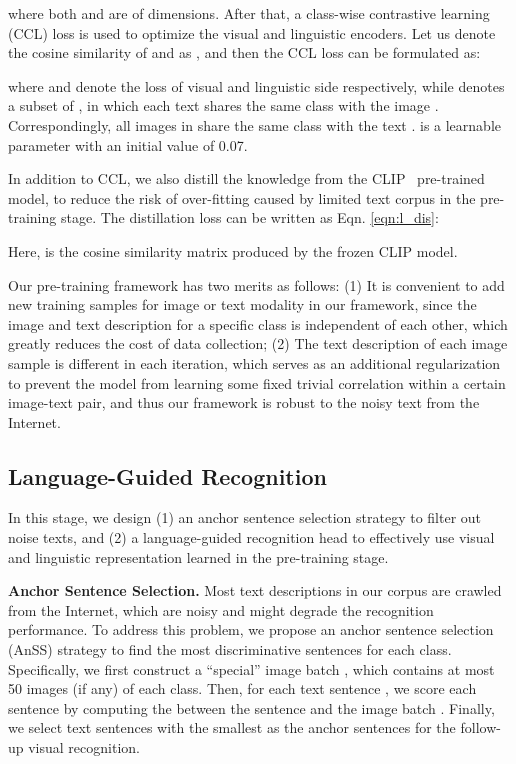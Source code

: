 \documentclass[runningheads]{llncs}
\begin{document}
where both  and  are of  dimensions. After that, a class-wise contrastive learning (CCL) loss is used to optimize the visual and linguistic encoders.
Let us denote the cosine similarity of  and  as , and then the CCL loss can be formulated as:

where  and  denote the loss of visual and linguistic side respectively, while  denotes a subset of , in which each text shares the same class with the image . Correspondingly, all images in  share the same class with the text .  is a learnable parameter with an initial value of 0.07.

In addition to CCL, we also distill the knowledge from the CLIP~\cite{clip} pre-trained model, to reduce the risk of over-fitting caused by limited text corpus in the pre-training stage.
The distillation loss  can be written as Eqn. \ref{eqn:l_dis}:

Here,  is the cosine similarity matrix produced by the frozen CLIP model.

Our pre-training framework has two merits as follows:
(1)
It is convenient to add new training samples for image or text modality in our framework,
since the image and text description for a specific class is independent of each other, which greatly reduces the cost of data collection;
(2) The text description of each image sample is different in each iteration, which serves as an additional regularization to prevent the model from learning some fixed trivial correlation within a certain image-text pair, and thus our framework is robust to the noisy text from the Internet.


\subsection{Language-Guided Recognition}

In this stage, we design (1) an anchor sentence selection strategy to filter out noise texts, and (2) a language-guided recognition head to effectively use visual and linguistic representation learned in the pre-training stage.

\noindent\textbf{Anchor Sentence Selection.} Most text descriptions in our corpus are crawled from the Internet, which are noisy and might degrade the recognition performance. 
To address this problem, we propose an anchor sentence selection (AnSS) strategy to find the most discriminative sentences for each class. 
Specifically, we first construct a ``special'' image batch , which contains at most 50 images (if any) of each class.
Then, for each text sentence , 
we score each sentence  by computing the  between the sentence and the image batch .
Finally, we select  text sentences with the smallest  as the anchor sentences for the follow-up visual recognition.
\end{document}
